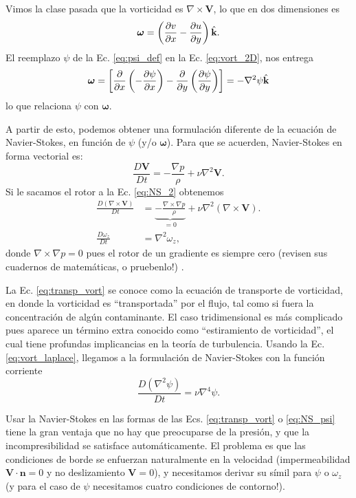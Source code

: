 Vimos la clase pasada que la vorticidad es $\nabla \times\mathbf{V}$, lo que en dos dimensiones es
%
\begin{equation}\label{eq:vort_2D}
\boldsymbol{\omega}=\left(\frac{\partial v}{\partial x}-\frac{\partial u}{\partial y} \right) \hat{\textbf{k}}.
\end{equation}
%
El reemplazo $\psi$ de la Ec. \eqref{eq:psi_def} en la Ec. \eqref{eq:vort_2D}, nos entrega
%
\begin{equation}\label{eq:vort_laplace}
\boldsymbol{\omega}=\left[\frac{\partial}{\partial x}\left(-\frac{\partial \psi}{\partial x}\right) -\frac{\partial}{\partial y}\left(\frac{\partial \psi}{\partial y}\right) \right] = -\nabla^2\psi\hat{\textbf{k}}
\end{equation}
%
lo que relaciona $\psi$ con $\boldsymbol{\omega}$.

A partir de esto, podemos obtener una formulación diferente de la ecuación de Navier-Stokes, en función de $\psi$ (y/o $\boldsymbol{\omega}$).
Para que se acuerden, Navier-Stokes en forma vectorial es:
%
\begin{equation}\label{eq:NS_2}
\frac{D\mathbf{V}}{Dt} = -\frac{\nabla p}{\rho} + \nu\nabla^2\mathbf{V}.
\end{equation}
%
Si le sacamos el rotor a la Ec. \eqref{eq:NS_2} obtenemos
%
\begin{align}\label{eq:transp_vort}
\frac{D(\nabla\times\mathbf{V})}{Dt} &= \underbrace{-\frac{\nabla\times\nabla p}{\rho}}_{=0} + \nu\nabla^2(\nabla\times\mathbf{V}). \nonumber\\
\frac{D \omega_z}{Dt} &= \nabla^2 \omega_z,
\end{align}
%
donde $\nabla\times\nabla p=0$ pues el rotor de un gradiente es siempre cero (revisen sus cuadernos de matemáticas, o pruebenlo!) .

La Ec. \eqref{eq:transp_vort} se conoce como la ecuación de transporte de vorticidad, en donde la vorticidad es ``transportada'' por el flujo, tal como si fuera la concentración de algún contaminante.
El caso tridimensional es más complicado pues aparece un término extra conocido como ``estiramiento de vorticidad'', el cual tiene profundas implicancias en la teoría de turbulencia.
Usando la Ec. \eqref{eq:vort_laplace}, llegamos a la formulación de Navier-Stokes con la función corriente
%
\begin{equation}\label{eq:NS_psi}
\frac{D(\nabla^2\psi)}{Dt} = \nu\nabla^4\psi.
\end{equation}

Usar la Navier-Stokes en las formas de las Ecs. \eqref{eq:transp_vort} o \eqref{eq:NS_psi} tiene la gran ventaja que no hay que preocuparse de la presión, y que la incompresibilidad se satisface automáticamente. 
El problema es que las condiciones de borde se enfuerzan naturalmente en la velocidad (impermeabilidad $\mathbf{V}\cdot\mathbf{n}=0$ y no deslizamiento $\mathbf{V}=0$), y necesitamos derivar su símil para $\psi$ o $\omega_z$ (y para el caso de $\psi$ necesitamos cuatro condiciones de contorno!).

